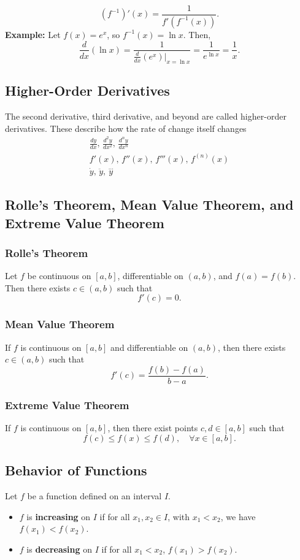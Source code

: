 \documentclass[11pt]{article}
\begin{document}
\[
    \left(f^{-1}\right)'(x) = \frac{1}{f'\left(f^{-1}(x)\right)}.
\]
\textbf{Example:} Let $f(x) = e^x$, so $f^{-1}(x) = \ln x$. Then,
\[
    \frac{d}{dx}(\ln x) = \frac{1}{\frac{d}{dx}(e^x)|_{x = \ln x}} = \frac{1}{e^{\ln x}} = \frac{1}{x}.
\]
\subsection{Higher-Order Derivatives}
The second derivative, third derivative, and beyond are called higher-order derivatives. 
These describe how the rate of change itself changes\\
\[
    \begin{array}{llll}
        \displaystyle
        \frac{dy}{dx}, \,
        \frac{d^2y}{dx^2}, \, 
        \frac{d^n y}{dx^n}\\[10pt]
        f'(x), \, f''(x), \, f'''(x), \, f^{(n)}(x)\\[6pt]
        \dot{y}, \, \ddot{y}, \, \overset{...}{y}
    \end{array}
\]
\subsection{Rolle's Theorem, Mean Value Theorem, and Extreme Value Theorem}
\subsubsection*{Rolle's Theorem}
Let $f$ be continuous on $[a, b]$, differentiable on $(a, b)$, and $f(a) = f(b)$.  
Then there exists $c \in (a, b)$ such that
\[
    f'(c) = 0.
\]
\subsubsection*{Mean Value Theorem}
If $f$ is continuous on $[a, b]$ and differentiable on $(a, b)$, then  
there exists $c \in (a, b)$ such that
\[
    f'(c) = \frac{f(b) - f(a)}{b - a}.
\]
\subsubsection*{Extreme Value Theorem}
If $f$ is continuous on $[a, b]$, then there exist points $c, d \in [a, b]$ such that
\[
    f(c) \leq f(x) \leq f(d) ,\quad \forall x \in [a, b].
\]
\subsection{Behavior of Functions}
Let $f$ be a function defined on an interval $I$.
\begin{itemize}
    \item $f$ is \textbf{increasing} on $I$ if for all $x_1, x_2 \in I$, with $x_1 < x_2$, we have $f(x_1) < f(x_2)$.
    \item $f$ is \textbf{decreasing} on $I$ if for all $x_1 < x_2$, $f(x_1) > f(x_2)$.
\end{itemize}
\end{document}
